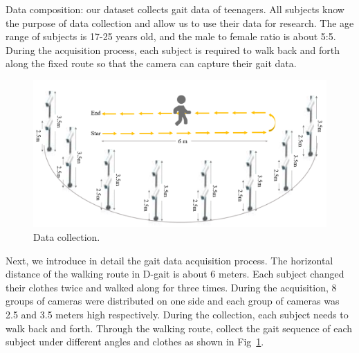 \documentclass[10pt,twocolumn,letterpaper]{article}
\begin{document}
Data composition:
our dataset collects gait data of teenagers.
All subjects know the purpose of data collection and allow us to use their data for research.
The age range of subjects is 17-25 years old, and the male to female ratio is about 5:5.
During the acquisition process, each subject is required to walk back and forth along the fixed route so that the camera can capture their gait data.

\begin{figure}[t]
  \centering
   \includegraphics[width=1.0\linewidth]{figures/collection.png}

   \caption{Data collection.
   }
   \label{collection}
\end{figure}

Next, we introduce in detail the gait data acquisition process.
The horizontal distance of the walking route in D-gait is about 6 meters.
Each subject changed their clothes twice and walked along for three times.
During the acquisition, 8 groups of cameras were distributed on one side and each group of cameras was 2.5 and 3.5 meters high respectively.
During the collection, each subject needs to walk back and forth.
Through the walking route, collect the gait sequence of each subject under different angles and clothes as shown in Fig~\ref{collection}.
\end{document}
